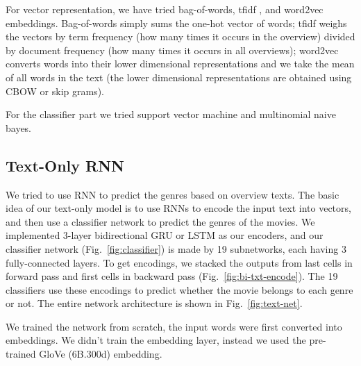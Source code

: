 \documentclass[12pt]{article} %
\begin{document}
For vector representation, we have tried bag-of-words, tfidf \cite{tfidf}, and word2vec \cite{word2vec} embeddings. Bag-of-words simply sums the one-hot vector of words; tfidf \cite{tfidf} weighs the vectors by term frequency (how many times it occurs in the overview) divided by document frequency (how many times it occurs in all overviews); word2vec \cite{word2vec} converts words into their lower dimensional representations and we take the mean of all words in the text (the lower dimensional representations are obtained using CBOW or skip grams).

For the classifier part we tried support vector machine and multinomial naive bayes.

\subsection{Text-Only RNN}
We tried to use RNN to predict the genres based on overview texts. The basic idea of our text-only model is to use RNNs to encode the input text into vectors, and then use a classifier network to predict the genres of the movies. We implemented 3-layer bidirectional GRU or LSTM as our encoders, and our classifier network (Fig.~\ref{fig:classifier}) is made by 19 subnetworks, each having 3 fully-connected layers. To get encodings, we stacked the outputs from last cells in forward pass and first cells in backward pass (Fig.~\ref{fig:bi-txt-encode}). The 19 classifiers use these encodings to predict whether the movie belongs to each genre or not. The entire network architecture is shown in Fig.~\ref{fig:text-net}.

We trained the network from scratch, the input words were first converted into embeddings. We didn't train the embedding layer, instead we used the pre-trained GloVe\cite{glove} (6B.300d) embedding.
\end{document}
